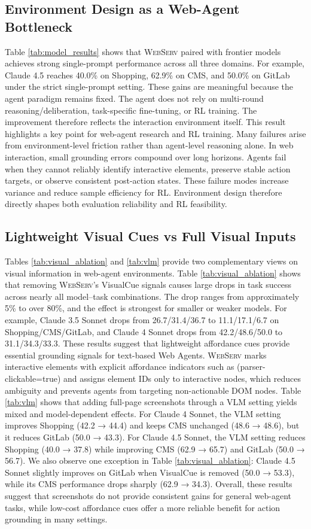 \documentclass{article}
\DeclareRobustCommand{\projectname}{\textsc{WebServ}\xspace}
\begin{document}
\subsection{Environment Design as a Web-Agent Bottleneck}
Table \ref{tab:model_results} shows that \projectname paired with frontier models achieves strong single-prompt performance across all three domains. For example, Claude 4.5 reaches 40.0\% on Shopping, 62.9\% on CMS, and 50.0\% on GitLab under the strict single-prompt setting. These gains are meaningful because the agent paradigm remains fixed. The agent does not rely on multi-round reasoning/deliberation, task-specific fine-tuning, or RL training. The improvement therefore reflects the interaction environment itself.
This result highlights a key point for web-agent research and RL training.
Many failures arise from environment-level friction rather than agent-level reasoning alone. 
In web interaction, small grounding errors compound over long horizons. Agents fail when they cannot reliably identify interactive elements, preserve stable action targets, or observe consistent post-action states. These failure modes increase variance and reduce sample efficiency for RL. Environment design therefore directly shapes both evaluation reliability and RL feasibility.

\subsection{Lightweight Visual Cues vs Full Visual Inputs}

Tables \ref{tab:visual_ablation} and \ref{tab:vlm} provide two complementary views on visual information in web-agent environments. Table \ref{tab:visual_ablation} shows that removing \projectname's VisualCue signals causes large drops in task success across nearly all model–task combinations. The drop ranges from approximately 5\% to over 80\%, and the effect is strongest for smaller or weaker models. For example, Claude 3.5 Sonnet drops from 26.7/31.4/36.7 to 11.1/17.1/6.7 on Shopping/CMS/GitLab, and Claude 4 Sonnet drops from 42.2/48.6/50.0 to 31.1/34.3/33.3. These results suggest that lightweight affordance cues provide essential grounding signals for text-based Web Agents. \projectname marks interactive elements with explicit affordance indicators such as (parser-clickable=true) and assigns element IDs only to interactive nodes, which reduces ambiguity and prevents agents from targeting non-actionable DOM nodes.
Table \ref{tab:vlm} shows that adding full-page screenshots through a VLM setting yields mixed and model-dependent effects. For Claude 4 Sonnet, the VLM setting improves Shopping (42.2 → 44.4) and keeps CMS unchanged (48.6 → 48.6), but it reduces GitLab (50.0 → 43.3). For Claude 4.5 Sonnet, the VLM setting reduces Shopping (40.0 → 37.8) while improving CMS (62.9 → 65.7) and GitLab (50.0 → 56.7). We also observe one exception in Table \ref{tab:visual_ablation}: Claude 4.5 Sonnet slightly improves on GitLab when VisualCue is removed (50.0 → 53.3), while its CMS performance drops sharply (62.9 → 34.3). Overall, these results suggest that screenshots do not provide consistent gains for general web-agent tasks, while low-cost affordance cues offer a more reliable benefit for action grounding in many settings.
\end{document}
